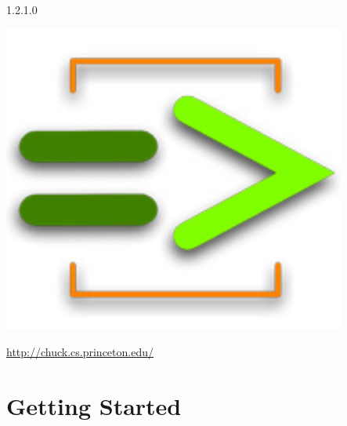 \documentclass[11pt]{report}
\begin{document}
\thispagestyle{coverplain}
\vskip 6in
{\huge


}

\begin{center}
 1.2.1.0
\end{center}
\vskip 1.5in
\begin{center}
  \includegraphics[height=4in]{images/chuck_logo2.jpg}

  \vskip 1in

  \Large{\href{http://chuck.cs.princeton.edu/}{http://chuck.cs.princeton.edu/}}
\end{center}

\newpage







\tableofcontents
\clearpage

\pagestyle{fancy}

\part*{Getting Started}
\end{document}
